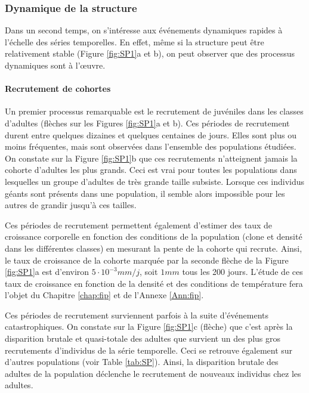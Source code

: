 \subsubsection{Dynamique de la structure}

Dans un second temps, on s'intéresse aux événements dynamiques rapides
à l'échelle des séries temporelles. En effet, même si la structure peut être
relativement stable (Figure \ref{fig:SP1}a et b), on peut observer que des
processus dynamiques sont à l'\oe{}uvre.
 
\paragraph{Recrutement de cohortes}

Un premier processus remarquable est le recrutement de juvéniles dans les
classes d'adultes (flèches sur les Figures \ref{fig:SP1}a et b). Ces périodes de
recrutement  durent entre quelques dizaines et quelques centaines de jours.
Elles sont plus ou moins fréquentes, mais sont observées dans l'ensemble des
populations étudiées. On constate sur la Figure \ref{fig:SP1}b que ces recrutements
n'atteignent jamais la cohorte d'adultes les plus grands.
Ceci est vrai pour toutes les populations dans lesquelles un groupe d'adultes
de très grande taille subsiste. Lorsque ces individus géants sont présents dans
une population, il semble alors impossible pour les autres de grandir jusqu'à
ces tailles.

Ces périodes de recrutement permettent également d'estimer des taux de
croissance corporelle en fonction des conditions de la population (clone et
densité dans les différentes classes) en mesurant la pente de la cohorte qui
recrute. Ainsi, le taux de croissance de la cohorte marquée par la seconde
flèche de la Figure \ref{fig:SP1}a est d'environ $5\cdot 10^{-3}mm/j$, soit
$1mm$ tous les 200 jours. L'étude de ces taux de croissance en fonction de la
densité et des conditions de température fera l'objet du Chapitre \ref{chap:fip}
et de l'Annexe \ref{Ann:fip}.

Ces périodes de recrutement surviennent parfois à la suite d'événements
catastrophiques. On constate sur la Figure \ref{fig:SP1}c (flèche) que c'est
après la disparition brutale et quasi-totale des adultes que survient un des
plus gros recrutements d'individus de la série temporelle. Ceci se retrouve
également sur d'autres populations (voir Table \ref{tab:SP}). Ainsi, la
disparition brutale des adultes de la population déclenche le recrutement de
nouveaux individus chez les adultes. 

